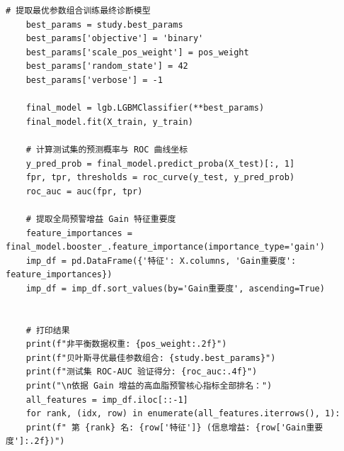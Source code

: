 \documentclass[12pt]{article}
\begin{document}
\begin{lstlisting}[caption={LightGBM-Optuna贝叶斯优化高血脂症诊断模型}, label={code:lgb_optuna_hyperlipidemia}]
	# 提取最优参数组合训练最终诊断模型
	best_params = study.best_params
	best_params['objective'] = 'binary'
	best_params['scale_pos_weight'] = pos_weight
	best_params['random_state'] = 42
	best_params['verbose'] = -1
	
	final_model = lgb.LGBMClassifier(**best_params)
	final_model.fit(X_train, y_train)
	
	# 计算测试集的预测概率与 ROC 曲线坐标
	y_pred_prob = final_model.predict_proba(X_test)[:, 1]
	fpr, tpr, thresholds = roc_curve(y_test, y_pred_prob)
	roc_auc = auc(fpr, tpr)
	
	# 提取全局预警增益 Gain 特征重要度
	feature_importances = final_model.booster_.feature_importance(importance_type='gain')
	imp_df = pd.DataFrame({'特征': X.columns, 'Gain重要度': feature_importances})
	imp_df = imp_df.sort_values(by='Gain重要度', ascending=True)
	
	
	# 打印结果
	print(f"非平衡数据权重: {pos_weight:.2f}")
	print(f"贝叶斯寻优最佳参数组合: {study.best_params}")
	print(f"测试集 ROC-AUC 验证得分: {roc_auc:.4f}")
	print("\n依据 Gain 增益的高血脂预警核心指标全部排名：")
	all_features = imp_df.iloc[::-1]
	for rank, (idx, row) in enumerate(all_features.iterrows(), 1):
	print(f" 第 {rank} 名: {row['特征']} (信息增益: {row['Gain重要度']:.2f})")
\end{lstlisting}
\end{document}
